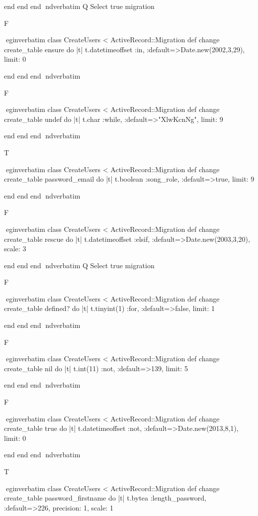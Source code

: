     end 
  end 
end
nd{verbatim}
Q
 Select true migration

F

egin{verbatim}
 class CreateUsers < ActiveRecord::Migration 
  def change 
    create_table ensure do |t| 
      t.datetimeoffset :in, :default=>Date.new(2002,3,29), limit: 0
    
    end 
  end 
end
nd{verbatim}

F

egin{verbatim}
 class CreateUsers < ActiveRecord::Migration 
  def change 
    create_table undef do |t| 
      t.char :while, :default=>"XlwKcnNg", limit: 9
    
    end 
  end 
end
nd{verbatim}

T

egin{verbatim}
 class CreateUsers < ActiveRecord::Migration 
  def change 
    create_table password_email do |t| 
      t.boolean :song_role, :default=>true, limit: 9
    
    end 
  end 
end
nd{verbatim}

F

egin{verbatim}
 class CreateUsers < ActiveRecord::Migration 
  def change 
    create_table rescue do |t| 
      t.datetimeoffset :elsif, :default=>Date.new(2003,3,20), scale: 3
    
    end 
  end 
end
nd{verbatim}
Q
 Select true migration

F

egin{verbatim}
 class CreateUsers < ActiveRecord::Migration 
  def change 
    create_table defined? do |t| 
      t.tinyint(1) :for, :default=>false, limit: 1
    
    end 
  end 
end
nd{verbatim}

F

egin{verbatim}
 class CreateUsers < ActiveRecord::Migration 
  def change 
    create_table nil do |t| 
      t.int(11) :not, :default=>139, limit: 5
    
    end 
  end 
end
nd{verbatim}

F

egin{verbatim}
 class CreateUsers < ActiveRecord::Migration 
  def change 
    create_table true do |t| 
      t.datetimeoffset :not, :default=>Date.new(2013,8,1), limit: 0
    
    end 
  end 
end
nd{verbatim}

T

egin{verbatim}
 class CreateUsers < ActiveRecord::Migration 
  def change 
    create_table password_firstname do |t| 
      t.bytea :length_password, :default=>226, precision: 1, scale: 1
    
